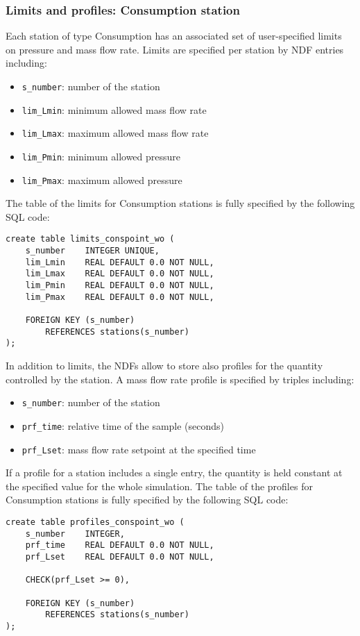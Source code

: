 \subsubsection{Limits and profiles: Consumption station}

Each station of type Consumption has an associated set of user-specified limits
on pressure and mass flow rate. Limits are specified per station by NDF entries
including:
\begin{itemize}
    \item \texttt{s\_number}:   number of the station
    \item \texttt{lim\_Lmin}:   minimum allowed mass flow rate
    \item \texttt{lim\_Lmax}:   maximum allowed mass flow rate
    \item \texttt{lim\_Pmin}:   minimum allowed pressure
    \item \texttt{lim\_Pmax}:   maximum allowed pressure
\end{itemize}
The table of the limits for Consumption stations is fully specified by the following SQL code:
\begin{verbatim}
create table limits_conspoint_wo (
    s_number    INTEGER UNIQUE,
    lim_Lmin    REAL DEFAULT 0.0 NOT NULL,
    lim_Lmax    REAL DEFAULT 0.0 NOT NULL,
    lim_Pmin    REAL DEFAULT 0.0 NOT NULL,
    lim_Pmax    REAL DEFAULT 0.0 NOT NULL,

    FOREIGN KEY (s_number)
        REFERENCES stations(s_number)
);
\end{verbatim}
In addition to limits, the NDFs allow to store also profiles for the quantity
controlled by the station. A mass flow rate profile is specified by triples including:
\begin{itemize}
    \item \texttt{s\_number}:   number of the station
    \item \texttt{prf\_time}:   relative time of the sample (seconds)
    \item \texttt{prf\_Lset}:   mass flow rate setpoint at the specified time
\end{itemize}
If a profile for a station includes a single entry, the quantity is held constant
at the specified value for the whole simulation. The table of the profiles for
Consumption stations is fully specified by the following SQL code:
\begin{verbatim}
create table profiles_conspoint_wo (
    s_number    INTEGER,
    prf_time    REAL DEFAULT 0.0 NOT NULL,
    prf_Lset    REAL DEFAULT 0.0 NOT NULL,

    CHECK(prf_Lset >= 0),

    FOREIGN KEY (s_number)
        REFERENCES stations(s_number)
);
\end{verbatim}

